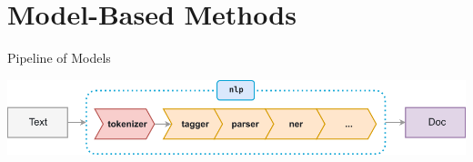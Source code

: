\documentclass[10pt]{beamer}
\begin{document}
\section{Model-Based Methods}

\begin{frame}{Pipeline of Models}

\begin{center}
  \includegraphics[width=1.0\textwidth]{figures/pipeline.png}
\end{center}

\end{frame}
\end{document}
